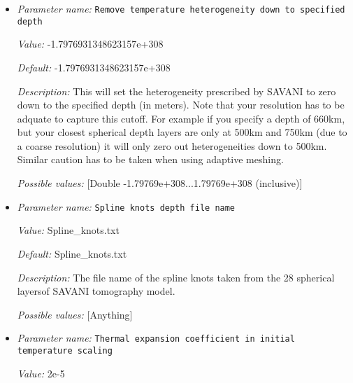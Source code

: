 \begin{itemize}
{\it Default:} true


{\it Description:} Option to remove the degree zero component from the perturbation, which will ensure that the laterally averaged temperature for a fixed depth is equal to the background temperature.


{\it Possible values:} [Bool]
\item {\it Parameter name:} {\tt Remove temperature heterogeneity down to specified depth}
\label{parameters:Initial conditions/SAVANI perturbation/Remove temperature heterogeneity down to specified depth}


{\it Value:} -1.7976931348623157e+308


{\it Default:} -1.7976931348623157e+308


{\it Description:} This will set the heterogeneity prescribed by SAVANI to zero down to the specified depth (in meters). Note that your resolution has to be adquate to capture this cutoff. For example if you specify a depth of 660km, but your closest spherical depth layers are only at 500km and 750km (due to a coarse resolution) it will only zero out heterogeneities down to 500km. Similar caution has to be taken when using adaptive meshing.


{\it Possible values:} [Double -1.79769e+308...1.79769e+308 (inclusive)]
\item {\it Parameter name:} {\tt Spline knots depth file name}
\label{parameters:Initial conditions/SAVANI perturbation/Spline knots depth file name}


{\it Value:} Spline_knots.txt


{\it Default:} Spline_knots.txt


{\it Description:} The file name of the spline knots taken from the 28 spherical layersof SAVANI tomography model.


{\it Possible values:} [Anything]
\item {\it Parameter name:} {\tt Thermal expansion coefficient in initial temperature scaling}
\label{parameters:Initial conditions/SAVANI perturbation/Thermal expansion coefficient in initial temperature scaling}


{\it Value:} 2e-5



\end{itemize}
